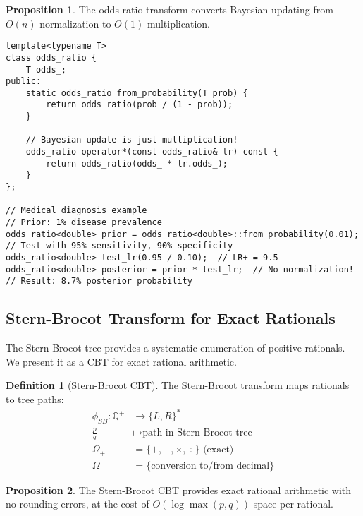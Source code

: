\documentclass[12pt,a4paper]{article}
\theoremstyle{definition}
\newtheorem{definition}{Definition}
\newtheorem{proposition}{Proposition}
\begin{document}
\begin{proposition}
The odds-ratio transform converts Bayesian updating from $O(n)$ normalization to $O(1)$ multiplication.
\end{proposition}

\begin{lstlisting}[caption={Bayesian inference via odds-ratio}]
template<typename T>
class odds_ratio {
    T odds_;
public:
    static odds_ratio from_probability(T prob) {
        return odds_ratio(prob / (1 - prob));
    }
    
    // Bayesian update is just multiplication!
    odds_ratio operator*(const odds_ratio& lr) const {
        return odds_ratio(odds_ * lr.odds_);
    }
};

// Medical diagnosis example
// Prior: 1% disease prevalence
odds_ratio<double> prior = odds_ratio<double>::from_probability(0.01);
// Test with 95% sensitivity, 90% specificity
odds_ratio<double> test_lr(0.95 / 0.10);  // LR+ = 9.5
odds_ratio<double> posterior = prior * test_lr;  // No normalization!
// Result: 8.7% posterior probability
\end{lstlisting}

\subsection{Stern-Brocot Transform for Exact Rationals}

The Stern-Brocot tree \cite{stern1858ueber, brocot1861calcul} provides a systematic enumeration of positive rationals. We present it as a CBT for exact rational arithmetic.

\begin{definition}[Stern-Brocot CBT]
The Stern-Brocot transform maps rationals to tree paths:
\begin{align}
\phi_{SB}: \mathbb{Q}^+ &\to \{L, R\}^* \\
\frac{p}{q} &\mapsto \text{path in Stern-Brocot tree} \\
\Omega_+ &= \{+, -, \times, \div\} \text{ (exact)} \\
\Omega_- &= \{\text{conversion to/from decimal}\}
\end{align}
\end{definition}

\begin{proposition}
The Stern-Brocot CBT provides exact rational arithmetic with no rounding errors, at the cost of $O(\log \max(p,q))$ space per rational.
\end{proposition}
\end{document}
